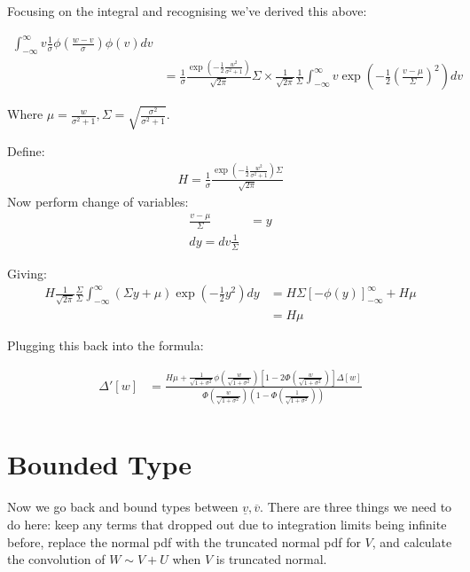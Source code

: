 \documentclass{article}
\begin{document}
Focusing on the integral and recognising we've derived this above:

\begin{align*}
    \int^\infty_{-\infty} v \frac{1}{\sigma}\phi\left(\frac{w - v}{\sigma}\right) \phi(v) dv \\ &=
    \frac{1}{\sigma} \frac{\exp\left(-\frac{1}{2}\frac{w^2}{\sigma^2 + 1}\right)}{
        \sqrt{2\pi}
    }
    \Sigma \times 
    \frac{1}{\sqrt{2\pi}}\frac{1}{\Sigma} \int^\infty_{-\infty}
    v \exp\left(
        -\frac{1}{2}
        \left(\frac{v - \mu}{\Sigma}\right)^2
    \right) dv
\end{align*}

Where $\mu = \frac{w}{\sigma^2 + 1}, \Sigma = \sqrt{\frac{\sigma^2}{\sigma^2 + 1}}$.

Define:
\begin{align*}
    H = \frac{1}{\sigma} \frac{
        \exp\left( 
            -\frac{1}{2}\frac{w^2}{\sigma^2 + 1}
        \right)\Sigma
    }{\sqrt{2\pi}}
\end{align*}
Now perform change of variables:
\begin{align*}
    \frac{v - \mu}{\Sigma} &= y \\
    dy = dv \frac{1}{\Sigma}
\end{align*}

Giving:
\begin{align*}
    H \frac{1}{\sqrt{2\pi}} \frac{\Sigma}{\Sigma} \int^\infty_{-\infty} \left(
        \Sigma y + \mu
    \right)\exp\left(-\frac{1}{2}y^2\right) dy &= 
H\Sigma \left[
    -\phi(y)
\right]^\infty_{-\infty} + H\mu \\
&= H\mu
\end{align*}


Plugging this back into the formula:

\begin{align*}
   \Delta'[w] &= 
   \frac{
    H\mu
    + \frac{1}{\sqrt{1 + \sigma^2}}\phi\left(\frac{w}{\sqrt{1 + \sigma^2}}\right) \left[
        1 - 2 \Phi(\frac{w}{\sqrt{1 + \sigma^2}})
    \right] \Delta[w]
   }{
    \Phi\left(\frac{w}{\sqrt{1 + \sigma^2}}\right)\left(1 - \Phi\left(\frac{1}{\sqrt{1 + \sigma^2}}\right)\right)
   } \\
\end{align*}

\section*{Bounded Type}

Now we go back and bound types between $\underline{v}, \overline{v}$. There are 
three things we need to do here: keep any terms that dropped out due to integration 
limits being infinite before, replace the normal pdf with the truncated normal pdf
for $V$, and calculate the convolution of $W\sim V + U$ when $V$ is truncated normal.
\end{document}
